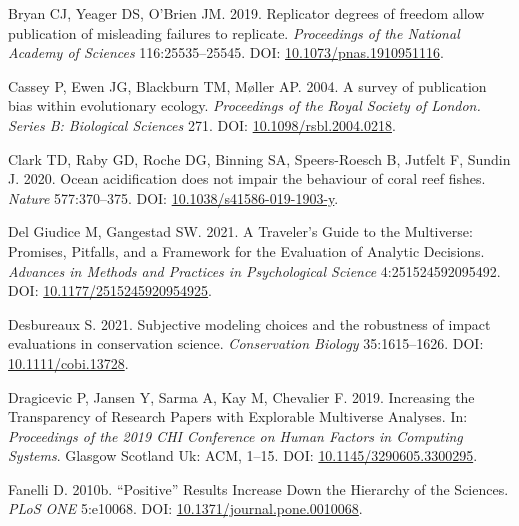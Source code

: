 \documentclass[10pt,a4paper]{article}
\newlength{\cslhangindent}
\newlength{\cslentryspacingunit} %
\newenvironment{CSLReferences}[2] %
 {%
  \setlength{\parindent}{0pt}
  \ifodd #1
  \let\oldpar\par
  \def\par{\hangindent=\cslhangindent\oldpar}
  \fi
  \setlength{\parskip}{#2\cslentryspacingunit}
 }%
 {}
\begin{document}
\begin{CSLReferences}{1}{0}
\leavevmode{}%
Bryan CJ, Yeager DS, O'Brien JM. 2019. Replicator degrees of freedom allow publication of misleading failures to replicate. \emph{Proceedings of the National Academy of Sciences} 116:25535--25545. DOI: \href{https://doi.org/10.1073/pnas.1910951116}{10.1073/pnas.1910951116}.

\leavevmode{}%
Cassey P, Ewen JG, Blackburn TM, Møller AP. 2004. A survey of publication bias within evolutionary ecology. \emph{Proceedings of the Royal Society of London. Series B: Biological Sciences} 271. DOI: \href{https://doi.org/10.1098/rsbl.2004.0218}{10.1098/rsbl.2004.0218}.

\leavevmode{}%
Clark TD, Raby GD, Roche DG, Binning SA, Speers-Roesch B, Jutfelt F, Sundin J. 2020. Ocean acidification does not impair the behaviour of coral reef fishes. \emph{Nature} 577:370--375. DOI: \href{https://doi.org/10.1038/s41586-019-1903-y}{10.1038/s41586-019-1903-y}.

\leavevmode{}%
Del Giudice M, Gangestad SW. 2021. A {Traveler}'s {Guide} to the {Multiverse}: {Promises}, {Pitfalls}, and a {Framework} for the {Evaluation} of {Analytic} {Decisions}. \emph{Advances in Methods and Practices in Psychological Science} 4:251524592095492. DOI: \href{https://doi.org/10.1177/2515245920954925}{10.1177/2515245920954925}.

\leavevmode{}%
Desbureaux S. 2021. Subjective modeling choices and the robustness of impact evaluations in conservation science. \emph{Conservation Biology} 35:1615--1626. DOI: \href{https://doi.org/10.1111/cobi.13728}{10.1111/cobi.13728}.

\leavevmode{}%
Dragicevic P, Jansen Y, Sarma A, Kay M, Chevalier F. 2019. Increasing the {Transparency} of {Research} {Papers} with {Explorable} {Multiverse} {Analyses}. In: \emph{Proceedings of the 2019 {CHI} {Conference} on {Human} {Factors} in {Computing} {Systems}}. Glasgow Scotland Uk: ACM, 1--15. DOI: \href{https://doi.org/10.1145/3290605.3300295}{10.1145/3290605.3300295}.

\leavevmode{}%
Fanelli D. 2010b. {``{Positive}''} {Results} {Increase} {Down} the {Hierarchy} of the {Sciences}. \emph{PLoS ONE} 5:e10068. DOI: \href{https://doi.org/10.1371/journal.pone.0010068}{10.1371/journal.pone.0010068}.


\end{CSLReferences}
\end{document}
